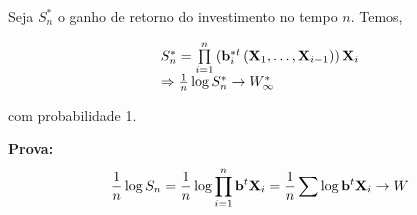 Seja $S_n^*$ o ganho de retorno do investimento no tempo $n$. Temos,

\[\begin{array}{l}
S_n^* = \prod\limits_{i = 1}^n {\left( {{\bf{b}}_i^{*t}\left( {{{\bf{X}}_1}, \ldots ,{{\bf{X}}_{i - 1}}} \right)} \right){{\bf{X}}_i}} \\
 \Rightarrow \frac{1}{n}\log S_n^* \to W_\infty ^*
\end{array}\]

com probabilidade 1.

\textbf{Prova:}
\[\frac{1}{n}\log {S_n} = \frac{1}{n}\log \prod\limits_{i = 1}^n {{{\bf{b}}^t}{{\bf{X}}_i}}  = \frac{1}{n}\sum\limits_{}^{} {\log {{\bf{b}}^t}{{\bf{X}}_i}}  \to W\]

